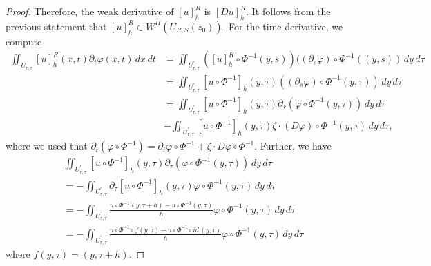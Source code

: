 \documentclass[10pt,a4paper]{amsart}
\numberwithin{equation}{section}
\begin{document}
\begin{proof}
Therefore, the weak derivative of $[u]_{h}^{R}$ is $[Du]_{h}^{R}$.
It follows from the previous statement that $[u]_{h}^{R}\in W^{H}(U_{R, S}(z_0))$. For the
time derivative, we compute
\begin{align*}
\iint_{U_{r, \tau}}[u]_{h}^{R}(x,t)\partial_{t}\varphi(x, t) \,dx \,dt & =\iint_{U^{\prime}_{r, \tau}}([u]_{h}^{R}\circ\Phi^{-1}(y,s))((\partial_{s}\varphi)\circ\Phi^{-1}((y,s))\,dy \, d\tau\\
 & =\iint_{U^{\prime}_{r, \tau}}[u\circ\Phi^{-1}]_{h}(y, \tau)((\partial_{s}\varphi)\circ\Phi^{-1}(y, \tau))\,dy\, d\tau\\
 & =\iint_{U^{\prime}_{r, \tau}}[u\circ\Phi^{-1}]_{h}(y, \tau)\partial_{s}(\varphi\circ\Phi^{-1}(y, \tau))\,dy\, d\tau\\
 &-\iint_{U^{\prime}_{r, \tau}}[u\circ\Phi^{-1}]_{h}(y, \tau)\zeta\cdot(D\varphi)\circ\Phi^{-1}(y, \tau)\,dy\, d\tau,
\end{align*}
where we used that $\partial_{t}(\varphi\circ\Phi^{-1})=\partial_{t}\varphi\circ\Phi^{-1}+\zeta\cdot D\varphi\circ\Phi^{-1}$.
Further, we have
\begin{align*}
&\iint_{U^{\prime}_{r, \tau}}[u\circ\Phi^{-1}]_{h}(y, \tau)\partial_{\tau}(\varphi\circ\Phi^{-1}(y, \tau))\,dy\, d\tau\\
& =-\iint_{U^{\prime}_{r, \tau}}\partial_{\tau}[u\circ\Phi^{-1}]_{h}(y, \tau)\varphi\circ\Phi^{-1}(y, \tau)\,dy\, d\tau\\
 & =-\iint_{U^{\prime}_{r, \tau}}\frac{u\circ\Phi^{-1}(y,\tau+h)-u\circ\Phi^{-1}(y,\tau)}{h}\varphi\circ\Phi^{-1}(y,\tau)\,dy\,d\tau\\
& =-\iint_{U^{\prime}_{r, \tau}}\frac{u\circ\Phi^{-1}\circ f(y,\tau)-u\circ\Phi^{-1} \circ id \,(y,\tau)}{h}\varphi\circ\Phi^{-1}(y,\tau)\,dy\,d\tau
\end{align*}
where $f(y, \tau)=(y, \tau+h).$


\end{proof}
\end{document}
